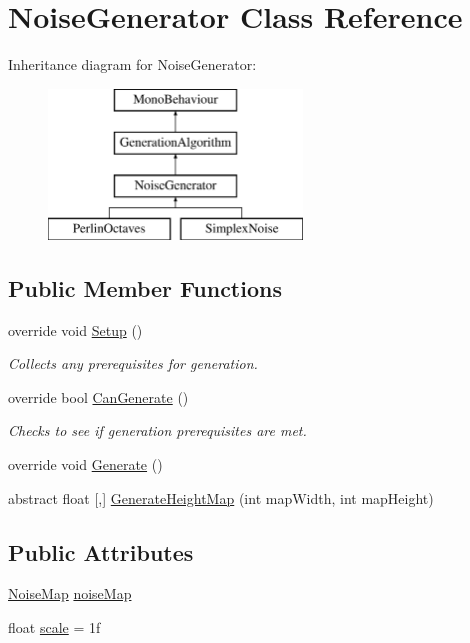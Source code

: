 \hypertarget{class_noise_generator}{}\section{Noise\+Generator Class Reference}
\label{class_noise_generator}
Inheritance diagram for Noise\+Generator\+:\begin{figure}[H]
\begin{center}
\leavevmode
\includegraphics[height=4.000000cm]{class_noise_generator}
\end{center}
\end{figure}
\subsection*{Public Member Functions}
\begin{DoxyCompactItemize}
\item 
override void \mbox{\hyperlink{class_noise_generator_ad87355d424b537a1a4065d525ec18400}{Setup}} ()
\begin{DoxyCompactList}\small\item\em Collects any prerequisites for generation. \end{DoxyCompactList}\item 
override bool \mbox{\hyperlink{class_noise_generator_a9f6eefc7403c8d228dc1752086e8c745}{Can\+Generate}} ()
\begin{DoxyCompactList}\small\item\em Checks to see if generation prerequisites are met. \end{DoxyCompactList}\item 
override void \mbox{\hyperlink{class_noise_generator_af97b78b12d39a0ae2d05e1d28c970005}{Generate}} ()
\item 
abstract float \mbox{[},\mbox{]} \mbox{\hyperlink{class_noise_generator_a1d3983a9ad33c2734f373e9f2d8f13d7}{Generate\+Height\+Map}} (int map\+Width, int map\+Height)
\end{DoxyCompactItemize}
\subsection*{Public Attributes}
\begin{DoxyCompactItemize}
\item 
\mbox{\hyperlink{class_noise_map}{Noise\+Map}} \mbox{\hyperlink{class_noise_generator_a19e92d7669706bdd2cae8229dc6331f4}{noise\+Map}}
\item 
float \mbox{\hyperlink{class_noise_generator_a411009c00c7e62e99dccd0dd3b98c661}{scale}} = 1f
\end{DoxyCompactItemize}
